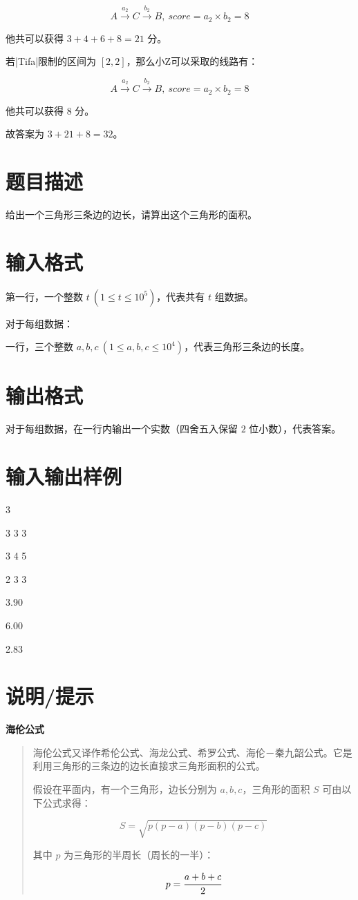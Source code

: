 \documentclass{ctpro}
\begin{document}
$$A \stackrel{a_2}{\rightarrow} C \stackrel{b_2}{\rightarrow} B,~score=a_2 \times b_2=8$$

他共可以获得 $3+4+6+8=21$ 分。

若|Tifa|限制的区间为 $[2,2]$，那么小Z可以采取的线路有：

$$A \stackrel{a_2}{\rightarrow} C \stackrel{b_2}{\rightarrow} B,~score=a_2 \times b_2=8$$

他共可以获得 $8$ 分。

故答案为 $3+21+8=32$。

\makeproblem
\section*{题目描述}
给出一个三角形三条边的边长，请算出这个三角形的面积。

\section*{输入格式}
第一行，一个整数 $t~(1 \leq t \leq 10^5)$，代表共有 $t$ 组数据。

对于每组数据：

\indent \indent 一行，三个整数 $a,b,c~(1 \leq a,b,c \leq 10^4)$，代表三角形三条边的长度。

\section*{输出格式}
对于每组数据，在一行内输出一个实数（四舍五入保留 $2$ 位小数），代表答案。


\section*{输入输出样例}
\testcasetab
{
	3 \par
	3 3 3\par
	3 4 5\par
	2 3 3
}
{
	3.90\par
	6.00\par
	2.83\par
}

\section*{说明/提示}
\textbf{海伦公式}
\begin{quotation}
	海伦公式又译作希伦公式、海龙公式、希罗公式、海伦－秦九韶公式。它是利用三角形的三条边的边长直接求三角形面积的公式。

	假设在平面内，有一个三角形，边长分别为 $a,b,c$，三角形的面积 $S$ 可由以下公式求得：

	$$S=\sqrt{p(p-a)(p-b)(p-c)}$$

	其中 $p$ 为三角形的半周长（周长的一半）：

	$$p=\cfrac{a+b+c}{2}$$
\end{quotation}
\end{document}
